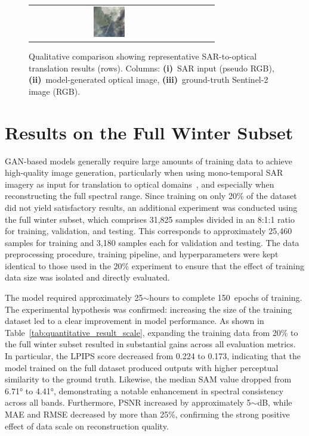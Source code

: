 \begin{figure}[h!]
\begin{tabular}{c *{3}{c}}
        \includegraphics[width=0.2\textwidth, height=0.2\textheight, keepaspectratio]{img/qualitative-20/sample_7/gt.png} \\
    \end{tabular}

    \caption[Qualitative results of 20\% training winter subset]{%
    Qualitative comparison showing representative SAR-to-optical translation results (rows). Columns: 
    \textbf{(i)}~SAR input (pseudo RGB), 
    \textbf{(ii)}~model-generated optical image, 
    \textbf{(iii)}~ground-truth Sentinel-2 image (RGB).
    }
    \label{fig:qualitative_results_20}
\end{figure}

\section{Results on the Full Winter Subset}
GAN-based models generally require large amounts of training data to achieve high-quality image generation, particularly when using mono-temporal SAR imagery as input for translation to optical domains~\cite{sar_2_opt_CGAN_survey_taxonomy}, and especially when reconstructing the full spectral range. Since training on only 20\% of the dataset did not yield satisfactory results, an additional experiment was conducted using the full winter subset, which comprises 31,825 samples divided in an 8:1:1 ratio for training, validation, and testing. This corresponds to approximately 25,460 samples for training and 3,180 samples each for validation and testing. The data preprocessing procedure, training pipeline, and hyperparameters were kept identical to those used in the 20\% experiment to ensure that the effect of training data size was isolated and directly evaluated.

The model required approximately 25$\sim$hours to complete 150~epochs of training. The experimental hypothesis was confirmed: increasing the size of the training dataset led to a clear improvement in model performance. As shown in Table~\ref{tab:quantitative_result_scale}, expanding the training data from 20\% to the full winter subset resulted in substantial gains across all evaluation metrics. In particular, the LPIPS score decreased from 0.224 to 0.173, indicating that the model trained on the full dataset produced outputs with higher perceptual similarity to the ground truth. Likewise, the median SAM value dropped from 6.71° to 4.41°, demonstrating a notable enhancement in spectral consistency across all bands. Furthermore, PSNR increased by approximately 5$\sim$dB, while MAE and RMSE decreased by more than 25\%, confirming the strong positive effect of data scale on reconstruction quality.

